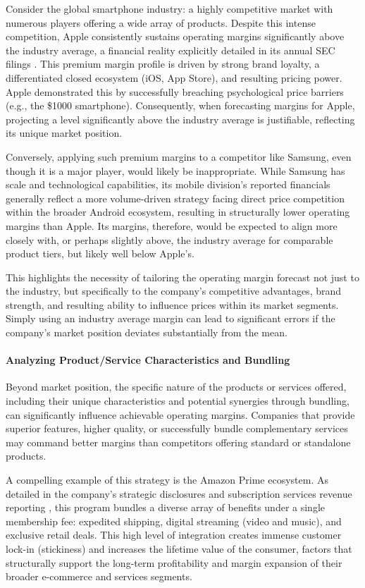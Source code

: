 Consider the global smartphone industry: a highly competitive market with numerous players offering a wide array of products. Despite this intense competition, Apple consistently sustains operating margins significantly above the industry average, a financial reality explicitly detailed in its annual SEC filings \parencite{apple202410k}. This premium margin profile is driven by strong brand loyalty, a differentiated closed ecosystem (iOS, App Store), and resulting pricing power. Apple demonstrated this by successfully breaching psychological price barriers (e.g., the \$1000 smartphone). Consequently, when forecasting margins for Apple, projecting a level significantly above the industry average is justifiable, reflecting its unique market position.

Conversely, applying such premium margins to a competitor like Samsung, even though it is a major player, would likely be inappropriate. While Samsung has scale and technological capabilities, its mobile division's reported financials \parencite{samsung2023annual} generally reflect a more volume-driven strategy facing direct price competition within the broader Android ecosystem, resulting in structurally lower operating margins than Apple. Its margins, therefore, would be expected to align more closely with, or perhaps slightly above, the industry average for comparable product tiers, but likely well below Apple's.

This highlights the necessity of tailoring the operating margin forecast not just to the industry, but specifically to the company's competitive advantages, brand strength, and resulting ability to influence prices within its market segments. Simply using an industry average margin can lead to significant errors if the company's market position deviates substantially from the mean.

\paragraph{Analyzing Product/Service Characteristics and Bundling}
Beyond market position, the specific nature of the products or services offered, including their unique characteristics and potential synergies through bundling, can significantly influence achievable operating margins. Companies that provide superior features, higher quality, or successfully bundle complementary services may command better margins than competitors offering standard or standalone products.

A compelling example of this strategy is the Amazon Prime ecosystem. As detailed in the company's strategic disclosures and subscription services revenue reporting \parencite{amazon202410k}, this program bundles a diverse array of benefits under a single membership fee: expedited shipping, digital streaming (video and music), and exclusive retail deals. This high level of integration creates immense customer lock-in (stickiness) and increases the lifetime value of the consumer, factors that structurally support the long-term profitability and margin expansion of their broader e-commerce and services segments.


